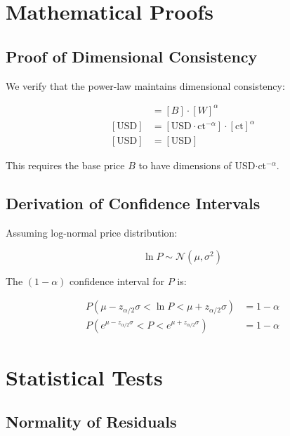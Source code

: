 \documentclass[12pt,a4paper]{article}
\begin{document}

\appendix

\section{Mathematical Proofs}
\label{app:proofs}

\subsection{Proof of Dimensional Consistency}

We verify that the power-law maintains dimensional consistency:

\begin{align}
[P] &= [B] \cdot [W]^{\alpha} \\
[\text{USD}] &= [\text{USD} \cdot \text{ct}^{-\alpha}] \cdot [\text{ct}]^{\alpha} \\
[\text{USD}] &= [\text{USD}]
\end{align}

This requires the base price $B$ to have dimensions of USD$\cdot$ct$^{-\alpha}$.

\subsection{Derivation of Confidence Intervals}

Assuming log-normal price distribution:

\begin{equation}
\ln P \sim \mathcal{N}(\mu, \sigma^2)
\end{equation}

The $(1-\alpha)$ confidence interval for $P$ is:

\begin{align}
P\left(\mu - z_{\alpha/2}\sigma < \ln P < \mu + z_{\alpha/2}\sigma \right) &= 1 - \alpha \\
P\left(e^{\mu - z_{\alpha/2}\sigma} < P < e^{\mu + z_{\alpha/2}\sigma} \right) &= 1 - \alpha
\end{align}

\section{Statistical Tests}
\label{app:tests}

\subsection{Normality of Residuals}
\end{document}
